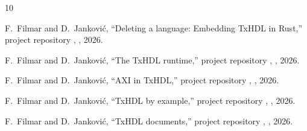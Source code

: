 \documentclass[journal,onecolumn,9pt]{IEEEtran}
\begin{document}
\begin{thebibliography}{10}

F.~Filmar and D.~Janković, ``Deleting a language: Embedding TxHDL in
Rust,'' project repository , ,
2026.

F.~Filmar and D.~Janković, ``The TxHDL runtime,'' project repository
, , 2026.

F.~Filmar and D.~Janković, ``AXI in TxHDL,'' project repository
, , 2026.

F.~Filmar and D.~Janković, ``TxHDL by example,'' project repository
, , 2026.

F.~Filmar and D.~Janković, ``TxHDL documents,'' project repository
, , 2026.

\end{thebibliography}
\end{document}

